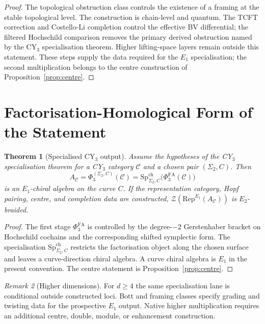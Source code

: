 \documentclass[11pt]{amsart}
\newtheorem{theorem}{Theorem}[section]
\theoremstyle{definition}
\theoremstyle{remark}
\newtheorem{remark}[theorem]{Remark}
\newcommand{\Rep}{\mathrm{Rep}}
\providecommand{\PhiFA}{\Phi^{\mathrm{FA}}}
\providecommand{\SpCh}{\mathrm{Sp}^{\mathrm{ch}}}
\newcommand{\cZ}{\mathcal{Z}}
\newcommand{\cC}{\mathcal{C}}
\begin{document}
\begin{proof}
The topological obstruction class controls the existence of a framing
at the stable topological level.  The construction is chain-level and
quantum.  The TCFT correction and Costello-Li completion control the
effective BV differential; the filtered
Hochschild comparison removes the primary derived obstruction named by
the CY$_3$ specialisation theorem.  Higher lifting-space layers remain
outside this statement.  These steps supply the data required for the
$E_1$ specialisation; the second multiplication belongs to the centre construction of
Proposition~\ref{prop:centre}.
\end{proof}

\section{Factorisation-Homological Form of the Statement}
\label{sec:reconstruction}

\begin{theorem}[Specialised CY$_3$ output]
\label{thm:e1-output-d3}
Assume the hypotheses of the CY$_3$ specialisation theorem for a CY$_3$
category $\cC$ and a chosen pair $(\Sigma_2,C)$.  Then
\[
  A_\cC
  =
  \Phi_3^{(\Sigma_2,C)}(\cC)
  =
  \SpCh_{\Sigma_2,C}\bigl(\PhiFA_3(\cC)\bigr)
\]
is an $E_1$-chiral algebra on the curve $C$.  If the representation
category, Hopf pairing, centre, and completion data are constructed,
$\cZ(\Rep^{E_1}(A_\cC))$ is $E_2$-braided.
\end{theorem}

\begin{proof}
The first stage $\PhiFA_3$ is controlled by the
degree-$-2$ Gerstenhaber bracket on Hochschild cochains and the
corresponding shifted symplectic form.  The specialisation
$\SpCh_{\Sigma_2,C}$ restricts the factorisation object along
the chosen surface and leaves a curve-direction chiral algebra.  A
curve chiral algebra is $E_1$ in the present convention.  The centre
statement is Proposition~\ref{prop:centre}.
\end{proof}

\begin{remark}[Higher dimensions]
For $d\geq 4$ the same specialisation lane is conditional outside
constructed loci.  Bott and framing classes specify grading and twisting
data for the prospective $E_1$ output.  Native higher multiplication
requires an additional centre, double, module, or enhancement
construction.
\end{remark}
\end{document}
